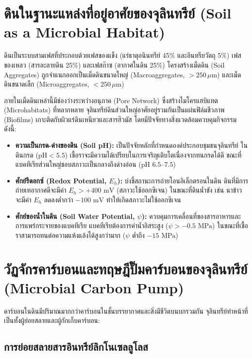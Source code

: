 \section{ดินในฐานะแหล่งที่อยู่อาศัยของจุลินทรีย์ (Soil as a Microbial Habitat)}

ดินเป็นระบบสามเฟสที่ประกอบด้วยเฟสของแข็ง (แร่ธาตุอนินทรีย์ 45\% และอินทรียวัตถุ 5\%) เฟสของเหลว (สารละลายดิน 25\%) และเฟสก๊าซ (อากาศในดิน 25\%) โครงสร้างเม็ดดิน (Soil Aggregates) ถูกจำแนกออกเป็นเม็ดดินขนาดใหญ่ (Macroaggregates, $>250\,\mu\text{m}$) และเม็ดดินขนาดเล็ก (Microaggregates, $<250\,\mu\text{m}$) 

ภายในเม็ดดินเหล่านี้มีช่องว่างระหว่างอนุภาค (Pore Network) ซึ่งสร้างไมโครแฮบิแทต (Microhabitats) ที่หลากหลาย จุลินทรีย์ดินส่วนใหญ่อาศัยอยู่รวมกันเป็นแผ่นฟิล์มชีวภาพ (Biofilms) เกาะติดกับผิวแร่ดินเหนียวและสารฮิวมัส โดยมีปัจจัยทางสิ่งแวดล้อมควบคุมกิจกรรมดังนี้:

\begin{itemize}
    \item \textbf{ความเป็นกรด-ด่างของดิน (Soil pH):} เป็นปัจจัยหลักที่กำหนดองค์ประกอบชุมชนจุลินทรีย์ ในดินกรด ($\text{pH} < 5.5$) เชื้อราจะมีความได้เปรียบในการเจริญเติบโตเนื่องจากทนกรดได้ดี ขณะที่แบคทีเรียส่วนใหญ่ชอบสภาวะเป็นกลางถึงด่างอ่อน ($\text{pH } 6.5$--$7.5$)
    \item \textbf{ศักย์รีดอกซ์ (Redox Potential, $E_h$):} บ่งชี้สถานะการถ่ายโอนอิเล็กตรอนในดิน ดินที่มีการถ่ายเทอากาศดีจะมีค่า $E_h > +400\text{ mV}$ (สภาวะใช้ออกซิเจน) ในขณะที่ดินน้ำขัง เช่น นาข้าว จะมีค่า $E_h$ ลดลงต่ำกว่า $-100\text{ mV}$ ทำให้เกิดสภาวะไม่ใช้ออกซิเจน
    \item \textbf{ศักย์ของน้ำในดิน (Soil Water Potential, $\psi$):} ควบคุมการเคลื่อนที่ของสารอาหารและการแพร่กระจายของแบคทีเรีย แบคทีเรียต้องการค่าน้ำอิสระสูง ($\psi > -0.5\text{ MPa}$) ในขณะที่เชื้อราสามารถทนต่อความแห้งแล้งได้สูงกว่ามาก ($\psi$ ต่ำถึง $-15\text{ MPa}$)
\end{itemize}

\section{วัฏจักรคาร์บอนและทฤษฎีปั๊มคาร์บอนของจุลินทรีย์ (Microbial Carbon Pump)}

คาร์บอนในดินมีปริมาณมากกว่าคาร์บอนในชั้นบรรยากาศและสิ่งมีชีวิตบนบกรวมกัน จุลินทรีย์ทำหน้าที่เป็นทั้งผู้ย่อยสลายและผู้กักเก็บคาร์บอน:

\subsection{การย่อยสลายสารอินทรีย์ลิกโนเซลลูโลส}

